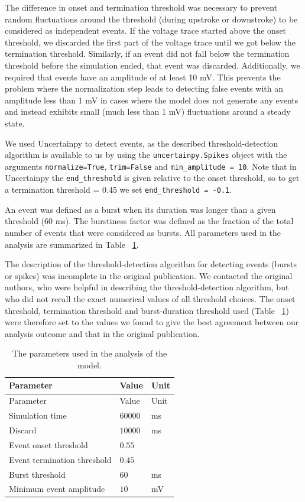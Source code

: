 \documentclass[10pt,a4paper,onecolumn]{article}
\begin{document}
The difference in onset and termination threshold was necessary to
prevent random fluctuations around the threshold (during upstroke or
downstroke) to be considered as independent events. If the voltage trace
started above the onset threshold, we discarded the first part of the
voltage trace until we got below the termination threshold. Similarly,
if an event did not fall below the termination threshold before the
simulation ended, that event was discarded. Additionally, we required
that events have an amplitude of at least 10 mV. This prevents the
problem where the normalization step leads to detecting false events
with an amplitude less than 1 mV in cases where the model does not
generate any events and instead exhibits small (much less than 1 mV)
fluctuations around a steady state.

We used Uncertainpy to detect events, as the described
threshold-detection algorithm is available to us by using the
\texttt{uncertainpy.Spikes} object with the arguments
\texttt{normalize=True}, \texttt{trim=False} and
\texttt{min\_amplitude\ =\ 10}. Note that in Uncertainpy the
\texttt{end\_threshold} is given relative to the onset threshold, so to
get a termination threshold = 0.45 we set
\texttt{end\_threshold\ =\ -0.1}.

An event was defined as a burst when its duration was longer than a
given threshold (60 ms). The burstiness factor was defined as the
fraction of the total number of events that were considered as bursts.
All parameters used in the analysis are summarized in Table
~\ref{tbl:parameters_analysis}.

The description of the threshold-detection algorithm for detecting
events (bursts or spikes) was incomplete in the original publication. We
contacted the original authors, who were helpful in describing the
threshold-detection algorithm, but who did not recall the exact
numerical values of all threshold choices. The onset threshold,
termination threshold and burst-duration threshold used (Table
~\ref{tbl:parameters_analysis}) were therefore set to the values we
found to give the best agreement between our analysis outcome and that
in the original publication.

\hypertarget{tbl:parameters_analysis}{}
\begin{longtable}[]{@{}lll@{}}
\caption{\label{tbl:parameters_analysis}The parameters used in the
analysis of the model. }\tabularnewline
\toprule
Parameter & Value & Unit\tabularnewline
\midrule
\endfirsthead
\toprule
Parameter & Value & Unit\tabularnewline
\midrule
\endhead
Simulation time & \(60000\) & ms\tabularnewline
Discard & \(10000\) & ms\tabularnewline
Event onset threshold & \(0.55\) &\tabularnewline
Event termination threshold & \(0.45\) &\tabularnewline
Burst threshold & \(60\) & ms\tabularnewline
Minimum event amplitude & \(10\) & mV\tabularnewline
\bottomrule
\end{longtable}
\end{document}
